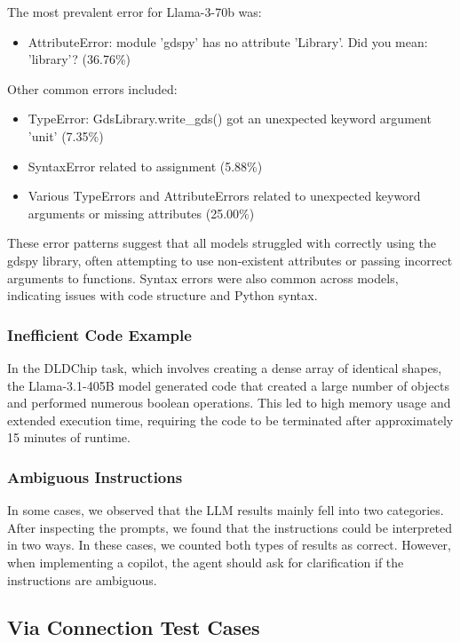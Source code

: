 \documentclass{article}
\begin{document}
The most prevalent error for Llama-3-70b was:
\begin{itemize}
    \item AttributeError: module 'gdspy' has no attribute 'Library'. Did you mean: 'library'? (36.76\%)
\end{itemize}

Other common errors included:
\begin{itemize}
    \item TypeError: GdsLibrary.write\_gds() got an unexpected keyword argument 'unit' (7.35\%)
    \item SyntaxError related to assignment (5.88\%)
    \item Various TypeErrors and AttributeErrors related to unexpected keyword arguments or missing attributes (25.00\%)
\end{itemize}

These error patterns suggest that all models struggled with correctly using the gdspy library, often attempting to use non-existent attributes or passing incorrect arguments to functions. Syntax errors were also common across models, indicating issues with code structure and Python syntax.

\subsubsection{Inefficient Code Example}
\label{appendix:inefficient_code}

In the DLDChip task, which involves creating a dense array of identical shapes, the Llama-3.1-405B model generated code that created a large number of objects and performed numerous boolean operations. This led to high memory usage and extended execution time, requiring the code to be terminated after approximately 15 minutes of runtime.

\subsubsection{Ambiguous Instructions}
\label{appendix:ambiguous_instructions}

In some cases, we observed that the LLM results mainly fell into two categories. After inspecting the prompts, we found that the instructions could be interpreted in two ways. In these cases, we counted both types of results as correct. However, when implementing a copilot, the agent should ask for clarification if the instructions are ambiguous.

\subsection{Via Connection Test Cases}
\label{appendix:via_connection}
\end{document}
